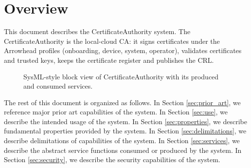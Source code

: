 \documentclass[a4paper]{arrowhead}
\begin{document}
\section{Overview}
\label{sec:overview}

This document describes the CertificateAuthority system. The Certificate\allowbreak{}Authority is the local-cloud CA: it signs certificates under the Arrowhead profiles (onboarding, device, system, operator), validates certificates and trusted keys, keeps the certificate register and publishes the CRL.

\begin{figure}[ht!]
  \centering
  \caption{SysML-style block view of CertificateAuthority with its produced and consumed services.}
  \label{fig:system}
\end{figure}

The rest of this document is organized as follows.
In Section \ref{sec:prior_art}, we reference major prior art capabilities of the system.
In Section \ref{sec:use}, we describe the intended usage of the system.
In Section \ref{sec:properties}, we describe fundamental properties provided by the system.
In Section \ref{sec:delimitations}, we describe delimitations of capabilities of the system.
In Section \ref{sec:services}, we describe the abstract service functions consumed or produced by the system.
In Section \ref{sec:security}, we describe the security capabilities of the system.
\end{document}
